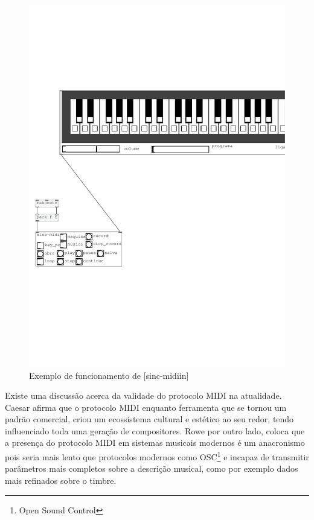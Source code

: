 \documentclass{ppgmus}
\begin{document}
\begin{figure}
\includegraphics[scale=.5]{sinc-midiin-help}
\caption{Exemplo de funcionamento de [sinc-midiin]}
\label{sinc-midiin-help}
\end{figure}



Existe uma discussão acerca da validade do protocolo MIDI na atualidade.
Caesar afirma que o protocolo MIDI enquanto ferramenta que se tornou um padrão
comercial, criou um ecossistema cultural e estético ao seu redor, tendo influenciado
toda uma geração de compositores. Rowe por outro lado, coloca que a presença do
protocolo MIDI em sistemas musicais modernos é um anacronismo pois seria mais lento
que protocolos modernos como OSC\footnote{Open Sound Control} e incapaz de transmitir parâmetros mais completos
sobre a descrição musical, como por exemplo dados mais
refinados sobre o timbre. 
\end{document}
